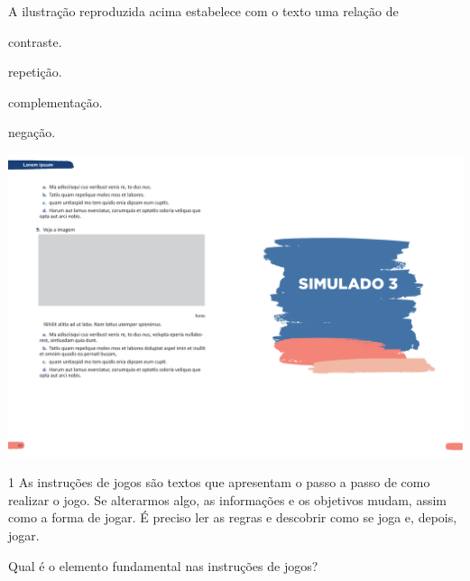 \begin{myquote}
\begin{myescolha}
\begin{myquote}
\end{myquote}

A ilustração reproduzida acima estabelece com o texto uma relação de

\begin{multicols}{2}
\begin{escolha}

  \item contraste.

  \item repetição.

  \item complementação.

  \item negação.

\end{escolha}
\end{multicols}
\pagebreak

\vspace*{-3.4cm}
\hspace*{-3.7cm}\includegraphics[scale=1]{../watermarks/3simulado5ano.pdf}
\pagebreak

\num{1} As instruções de jogos são textos que apresentam o passo a passo
de como realizar o jogo. Se alterarmos algo, as informações e os objetivos
mudam, assim como a forma de jogar. É preciso ler as regras e descobrir
como se joga e, depois, jogar.

Qual é o elemento fundamental nas instruções de jogos?


\end{myescolha}
\end{myquote}
